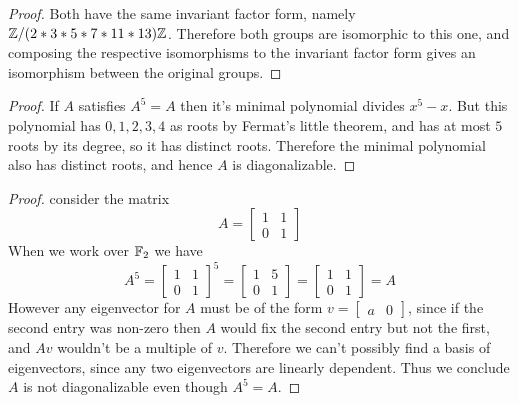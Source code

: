 \documentclass[11pt]{article}
\begin{document}
\begin{proof}
  Both have the same invariant factor form, namely $\mathbb{Z}/(2*3*5*7*11*13)\mathbb{Z}$. Therefore both groups are isomorphic to this one, and composing the respective isomorphisms to the invariant factor form gives an isomorphism between the original groups.
\end{proof}

\begin{proof}
  If $A$ satisfies $A^5 = A$ then it's minimal polynomial divides $x^5 - x$.
  But this polynomial has $0,1,2,3,4$ as roots by Fermat's little theorem, and has at most $5$ roots by its degree, so it has distinct roots.
  Therefore the minimal polynomial also has distinct roots, and hence $A$ is diagonalizable.
\end{proof}

\begin{proof}
  consider the matrix
  \begin{equation*}
    A = \begin{bmatrix}
      1 & 1 \\ 0 & 1
    \end{bmatrix}
  \end{equation*}
  When we work over $\mathbb{F}_2$ we have
  \begin{equation*}
    A^5 = \begin{bmatrix}
      1 & 1 \\ 0 & 1
    \end{bmatrix}^5
    = \begin{bmatrix}
      1 & 5 \\ 0 & 1
    \end{bmatrix}
    = \begin{bmatrix}
      1 & 1 \\ 0 & 1
    \end{bmatrix} = A
  \end{equation*}
  However any eigenvector for $A$ must be of the form $v = \begin{bmatrix} a & 0 \end{bmatrix}$, since if the second entry was non-zero then $A$ would fix the second entry but not the first, and $Av$ wouldn't be a multiple of $v$.
  Therefore we can't possibly find a basis of eigenvectors, since any two eigenvectors are linearly dependent.
  Thus we conclude $A$ is not diagonalizable even though $A^5 = A$.
\end{proof}
\end{document}
